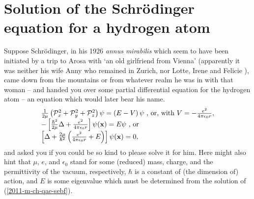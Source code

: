 \section{Solution of the Schr\"odinger equation for a hydrogen atom}

Suppose Schr\"odinger, in his 1926 {\it annus mirabilis}
which seem to have been initiated by a trip to Arosa with `an old girlfriend from Vienna'
(apparently it was neither his wife Anny who remained in Zurich, nor Lotte, Irene and Felicie \cite{Moore-Schroedinger}),
came down from the mountains or from whatever realm he was in with that woman -- and
handed you over some partial differential equation  for the hydrogen atom
-- an equation which would later bear his name.
\begin{equation}
\begin{array}{l}
 \frac{1}{2\mu }\left({\cal P}_x^2 +{\cal P}_y^2 +{\cal P}_z^2\right) \psi = \left( E-V \right)\psi \textrm{ , or, with } V=-\frac{e^2}{4\pi \epsilon_0 r}, \\
 -\left[ \frac{\hbar^2}{2\mu }\Delta +  \frac{e^2}{4\pi \epsilon_0r} \right]\psi ({\bf x})= E\psi \textrm{ , or}\\
 \left[ \Delta + \frac{2\mu }{\hbar^2} \left(\frac{e^2}{4\pi \epsilon_0r} + E \right)\right]\psi ({\bf x})=0,
\end{array}
\label{2011-m-ch-qae-sebf}
\end{equation}
and asked you if you could be so kind to please solve it for him.
Here might also hint that $\mu$, $e$, and $\epsilon_0$ stand for some (reduced) mass, charge, and the  permittivity of the vacuum, respectively,
$\hbar$ is a constant of (the dimension of) action,
and $E$ is some eigenvalue which must be determined from
the solution of (\ref{2011-m-ch-qae-sebf}).

